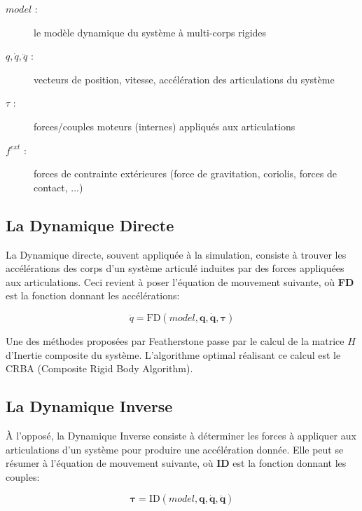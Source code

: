 \documentclass{report}
\begin{document}
\begin{description}
  \item[$model$ :] le modèle dynamique du système à multi-corps rigides
  \item[$q, \dot{q}, \ddot{q}$ :] vecteurs de position, vitesse, accélération des articulations du système
  \item[$\tau$ :] forces/couples moteurs (internes) appliqués aux articulations
  \item[$f^{ext}$ :] forces de contrainte extérieures (force de gravitation, coriolis, forces de contact, ...)
\end{description}

\subsection{La Dynamique Directe}

La Dynamique directe, souvent appliquée à la simulation, consiste à trouver les accélérations des corps d'un système articulé induites par des forces appliquées aux articulations. Ceci revient à poser l'équation de mouvement suivante, où \textbf{FD} est la fonction donnant les accélérations:

\begin{equation}
\ddot{q} = \mathrm{FD}(model,\mathbf{q,\dot{q},\tau})
\end{equation}

Une des méthodes proposées par Featherstone \cite[(6.2)]{bib_featherstone} passe par le calcul de la matrice $H$ d'Inertie composite du système.  L'algorithme optimal réalisant ce calcul est le CRBA (Composite Rigid Body Algorithm).

\subsection{La Dynamique Inverse}

\`{A} l'opposé, la Dynamique Inverse consiste à déterminer les forces à appliquer aux articulations d'un système pour produire une accélération donnée. Elle peut se résumer à l'équation de mouvement suivante, où \textbf{ID} est la fonction donnant les couples:

\begin{equation}
\mathbf{\tau} = \mathrm{ID}(model,\mathbf{q,\dot{q},\ddot{q}})
\end{equation}
\end{document}
